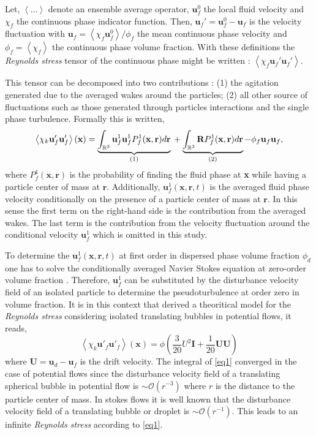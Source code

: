 \documentclass[a4paper,11pt]{article}
\newcommand{\avg}[1]{\left<#1\right>}
\theoremstyle{mytheoremstyle}
\theoremstyle{mytheoremstyle}
\theoremstyle{myproblemstyle}
\begin{document}
Let, $\avg{\ldots}$ denote an ensemble average operator, $\textbf{u}_f^0$ the local fluid velocity and $\chi_f$ the continuous phase indicator function.
Then, $\textbf{u}_f' = \textbf{u}_f^0 - \textbf{u}_f$ is the velocity fluctuation with $\textbf{u}_f =\avg{\chi_f \textbf{u}_f^0} / \phi_f$ the mean continuous phase velocity and $\phi_f = \avg{\chi_f}$ the continuous phase volume fraction. 
With these definitions the \textit{Reynolds stress} tensor of the continuous phase might be written : $\avg{\chi_f \textbf{u}_f' \textbf{u}_f'}$.

This tensor can be decomposed into two contributions : (1) the agitation generated due to the averaged wakes around the particles; (2) all other source of fluctuations such as those generated through particles interactions and the single phase turbulence. 
Formally this is written, 
\begin{equation}
    \avg{\chi_k \textbf{u}'_f\textbf{u}'_f}(\textbf{x})
    = 
    \underbrace{\int_{\mathbb{R}^3}\textbf{u}_f^1\textbf{u}_f^1 P_{f}^1(\textbf{x},\textbf{r}) d\textbf{r} }_\text{(1)}
    \\+\underbrace{\int_{\mathbb{R}^3} \textbf{R} P_{f}^1(\textbf{x},\textbf{r}) d\textbf{r}}_\text{(2)}
    - \phi_f \textbf{u}_f\textbf{u}_f,
    \label{eq1}
\end{equation}
where $P_f^1(\textbf{x},\textbf{r})$ is the probability of finding the fluid phase at \textbf{x} while having a particle center of mass at $\textbf{r}$. 
Additionally, $\textbf{u}_f^1(\textbf{x},\textbf{r},t)$ is the averaged fluid phase velocity conditionally on the presence of a particle center of mass at $\textbf{r}$.
In this sense the first term on the right-hand side is the contribution from the averaged wakes. 
The last term is the contribution from the velocity fluctuation around the conditional velocity $\textbf{u}_f^1$ which is omitted in this study. 

To determine the  $\textbf{u}_f^1(\textbf{x},\textbf{r},t)$ at first order in dispersed phase volume fraction $\phi_d$ one has to solve the conditionally averaged Navier Stokes equation at zero-order volume fraction \cite{hinch1977averaged}.
Therefore, $\textbf{u}_f^1$ can be substituted by the disturbance velocity field of an isolated particle to determine the pseudoturbulence at order zero in volume fraction.
It is in this context that \cite{van1998pseudo} derived a theoritical model for the \textit{Reynolds stress} considering isolated translating bubbles in potential flows, it reads, 
\begin{equation}
    \avg{\chi_k \textbf{u}'_f\textbf{u}'_f}(\textbf{x})
    = \phi \left(\frac{3}{20} U^2\textbf{I} + \frac{1}{20} \textbf{UU} \right)
\end{equation}
where $\textbf{U} = \textbf{u}_d - \textbf{u}_f$ is the drift velocity. 
The integral of \ref{eq1} converged in the case of potential flows since the disturbance velocity field of a translating spherical bubble in potential flow is $\sim \mathcal{O}(r^{-3})$ where $r$ is the distance to the particle center of mass.  
In stokes flows it is well known that the disturbance velocity field of a translating bubble or droplet is $\sim \mathcal{O}(r^{-1})$.
This leads to an infinite \textit{Reynolds stress} according to  \ref{eq1}. 
\end{document}
